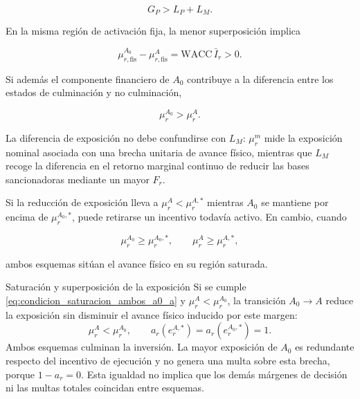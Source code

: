 \begin{equation}
\label{eq:condicion_incentivo_a_a0_rs}
G_P
>
L_P+L_M.
\end{equation}

En la misma región de activación fija, la menor superposición implica

\begin{equation}
\label{eq:diferencia_exposicion_fisica_a0_a}
\mu_{r,\mathrm{fis}}^{A_0}
-
\mu_{r,\mathrm{fis}}^{A}
=
\mathrm{WACC}\,\bar I_r
>
0.
\end{equation}

Si además el componente financiero de \(A_0\) contribuye a la diferencia entre los estados de culminación y no culminación,

\begin{equation}
\label{eq:orden_exposicion_a0_a}
\mu_r^{A_0}
>
\mu_r^{A}.
\end{equation}

La diferencia de exposición no debe confundirse con \(L_M\): \(\mu_r^m\) mide la exposición nominal asociada con una brecha unitaria de avance físico, mientras que \(L_M\) recoge la diferencia en el retorno marginal continuo de reducir las bases sancionadoras mediante un mayor \(F_r\).

Si la reducción de exposición lleva a \(\mu_r^{A}<\mu_r^{A,*}\) mientras \(A_0\) se mantiene por encima de \(\mu_r^{A_0,*}\), puede retirarse un incentivo todavía activo. En cambio, cuando

\begin{equation}
\label{eq:condicion_saturacion_ambos_a0_a}
\mu_r^{A_0}
\geq
\mu_r^{A_0,*},
\qquad
\mu_r^{A}
\geq
\mu_r^{A,*},
\end{equation}

ambos esquemas sitúan el avance físico en su región saturada.

\begin{resultadobox}
{Saturación y superposición de la exposición}
\label{res:saturacion_superposicion}
Si se cumple \eqref{eq:condicion_saturacion_ambos_a0_a} y \(\mu_r^{A}<\mu_r^{A_0}\), la transición \(A_0\to A\) reduce la exposición sin disminuir el avance físico inducido por este margen:
\begin{equation}
\mu_r^{A}
<
\mu_r^{A_0},
\qquad
a_r(e_r^{A,*})
=
a_r(e_r^{A_0,*})
=
1.
\end{equation}
Ambos esquemas culminan la inversión. La mayor exposición de \(A_0\) es redundante respecto del incentivo de ejecución y no genera una multa sobre esta brecha, porque \(1-a_r=0\). Esta igualdad no implica que los demás márgenes de decisión ni las multas totales coincidan entre esquemas.
\end{resultadobox}

